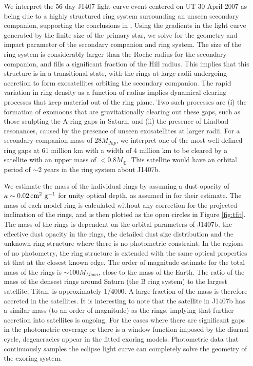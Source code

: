 \documentclass{emulateapj}
\begin{document}
We interpret the 56 day J1407 light curve event centered on UT 30 April
2007 as being due to a highly structured ring system surrounding an
unseen secondary companion, supporting the conclusions in
\citet{Mamajek12,vanWerkhoven14,Kenworthy15}.
Using the gradients in the light curve generated by the finite size of
the primary star, we solve for the geometry and impact parameter of the
secondary companion and ring system.
The size of the ring system is considerably larger than the Roche radius
for the secondary companion, and fills a significant fraction of the
Hill radius.
This implies that this structure is in a transitional state, with the
rings at large radii undergoing accretion to form exosatellites orbiting
the secondary companion.
The rapid variation in ring density as a function of radius implies
dynamical clearing processes that keep material out of the ring
plane.
Two such processes are (i) the formation of exomoons that are
gravitationally clearing out these gaps, such as those sculpting the
A-ring gaps in Saturn, and (ii) the presence of Lindbad resonances, caused by
the presence of unseen exosatellites at larger radii.
For a secondary companion mass of $28 M_{Jup}$, we interpret one of the
most well-defined ring gaps
at 61 million km with a width of 4 million km to be cleared by a
satellite with an upper mass of $< 0.8 M_\oplus$.
This satellite would have an orbital period of $\sim 2$ years in the
ring system about J1407b.

We estimate the mass of the individual rings by assuming a dust opacity
of $\kappa \sim 0.02\, {\rm cm}^2\ {\rm g}^{-1}$ for unity optical
depth, as assumed in \citet{Mamajek12} for their estimate.
The mass of each model ring is calculated without any correction for the
projected inclination of the rings, and is then plotted as the open
circles in Figure \ref{fig:tfit}.
The mass of the rings is dependent on the orbital parameters of J1407b,
the effective dust opacity in the rings, the detailed dust size
distribution and the unknown ring structure where there is no
photometric constraint.
In the regions of no photometry, the ring structure is extended with the
same optical properties at that at the closest known edge.
The order of magnitude estimate for the total mass of the rings is
$\sim 100M_{Moon}$, close to the mass of the Earth.
The ratio of the mass of the densest rings around Saturn (the B ring
system) to the largest satellite, Titan, is approximately 1/4000.
A large fraction of the mass is therefore accreted in the satellites.
It is interesting to note that the satellite in J1407b has a similar
mass (to an order of magnitude) as the rings, implying that further
accretion into satellites is ongoing.
For the cases where there are significant gaps in the photometric
coverage or there is a window function imposed by the diurnal cycle,
degeneracies appear in the fitted exoring models.
Photometric data that continuously samples the eclipse light curve can
completely solve the geometry of the exoring system.
\end{document}

